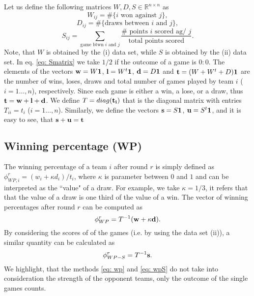 \documentclass{article}
\def\vect#1{\mbox{$\bf #1$}}
\begin{document}
Let us define the following matrices $W, D, S \in \mathbb{R}^{n \times n}$ as
\begin{equation}\label{eq: Wmatrix}
W_{ij}=\#\{i \textrm{ won against } j\},
\end{equation}
\begin{equation}\label{eq: Dmatrix}
D_{ij}=\#\{\textrm{draws between } i \textrm{ and } j\},
\end{equation}
\begin{equation}\label{eq: Smatrix}
S_{ij}=\sum_{\textrm{game btwn } i \textrm{ and } j} \frac{\# \textrm{ points } i \textrm{ scored ag/ } j}{\textrm{total points scored}}.
\end{equation}
Note, that $W$ is obtained by the (i) data set, while $S$ is obtained by the (ii) data set. In eq. \ref{eq: Smatrix} we take $1/2$ if the outcome of a game is $0:0$. The elements of the vectors $\vect{w}=W\mathbb{\vect{1}}$, $\vect{l}=W^{t}\mathbb{\vect{1}}$, $\vect{d}=D\mathbb{\vect{1}}$  and $\vect{t}=(W+W^{t}+D)\mathbb{\vect{1}}$ are the number of wins, loses, draws and total number of games played by team $i$ ($i=1\dots, n$), respectively. Since each game is either a win, a lose, or a draw, thus $\vect{t}=\vect{w}+\vect{l}+\vect{d}$. We define $T=diag(\vect{t_i})$ that is the diagonal matrix with entries $T_{ii}=t_i$ ($i=1\dots, n$). Similarly, we define the vectors $\vect{s}=S\mathbb{\vect{1}}$, $\vect{u}=S^{t}\mathbb{\vect{1}}$, and it is easy to see, that $\vect{s}+\vect{u}=\vect{t}$



\subsection{Winning percentage (WP)}
The winning percentage of a team $i$ after round $r$ is simply defined as $\phi^{r}_{WP, i}= (w_i+\kappa d_i)/t_i$, where $\kappa$ is parameter between $0$ and $1$ and can be interpreted as the ``value" of a draw. For example, we take $\kappa=1/3$, it refers that that the value of a draw is one third of the value of a win. The vector of winning percentages after round $r$ can be computed as 
\begin{equation}\label{eq: wp}
\phi^{r}_{WP}=T^{-1}(\vect{w}+\kappa\vect{d}).
\end{equation}
By considering the scores of of the games (i.e. by using the data set (ii)), a similar quantity can be calculated as
\begin{equation}\label{eq: wpS}
\phi^{r}_{WP-S}=T^{-1}\vect{s}.
\end{equation}
We highlight, that the methods \ref{eq: wp} and \ref{eq: wpS} do not take into consideration the strength of the opponent teams, only the outcome of the single games counts.
\end{document}
